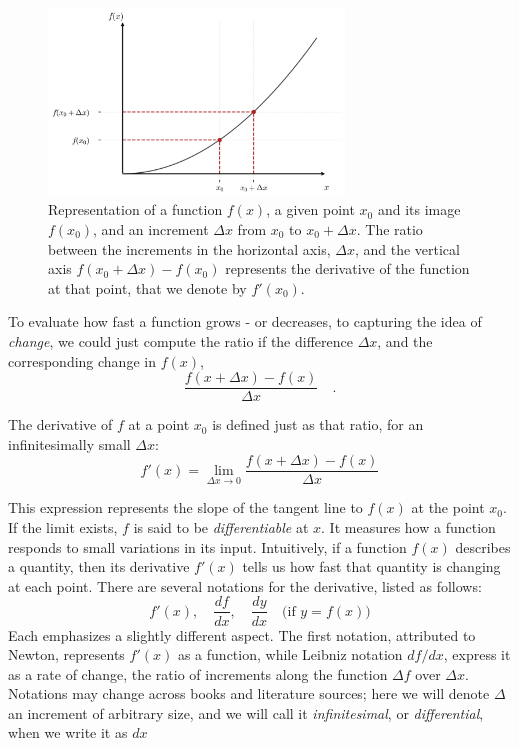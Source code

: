 \documentclass{book}
\begin{document}
\begin{figure}[ht]
    \centering
    \includegraphics[width=0.7\textwidth]{figures/appendix/functions_point_2.png}
    \caption{Representation of a function $f(x)$, a given point $x_0$ and its image $f(x_0)$, and an increment $\Delta x$ from $x_0$ to $x_0 + \Delta x$. The ratio between the increments in the horizontal axis, $\Delta x$, and the vertical axis $f(x_0 + \Delta x) - f(x_0)$ represents the derivative of the function at that point, that we denote by $f'(x_0)$.}
    \label{fig:functions_point_2}
\end{figure}

To evaluate how fast a function grows - or decreases, to capturing the idea of \emph{change}, we could just compute the ratio if the difference $\Delta x$, and the corresponding change in $f(x)$, 
\begin{equation}
	\frac{f(x + \Delta x) - f(x)}{\Delta x} \quad.
\end{equation}

The derivative of \( f \) at a point \( x_0 \) is defined just as that ratio, for an infinitesimally small $\Delta x$:
\begin{equation}
	f'(x) = \lim_{\Delta x \to 0} \frac{f(x + \Delta x) - f(x)}{\Delta x}
\end{equation}

This expression represents the slope of the tangent line to \( f(x) \) at the point \( x_0 \). If the limit exists, \( f \) is said to be \emph{differentiable} at \( x \). It measures how a function responds to small variations in its input. Intuitively, if a function \( f(x) \) describes a quantity, then its derivative \( f'(x) \) tells us how fast that quantity is changing at each point. There are several notations for the derivative, listed as follows:
\[
f'(x), \quad \frac{df}{dx}, \quad \frac{dy}{dx} \quad \text{(if } y = f(x) \text{)}
\]
Each emphasizes a slightly different aspect. The first notation, attributed to Newton, represents $f'(x)$ as a function, while Leibniz notation $df / dx$, express it as a rate of change, the ratio of increments along the function $\Delta f$ over $\Delta x$. Notations may change across books and literature sources; here we will denote $\Delta$ an increment of arbitrary size, and we will call it \textit{infinitesimal}, or \textit{differential}, when we write it as $dx$
\end{document}
